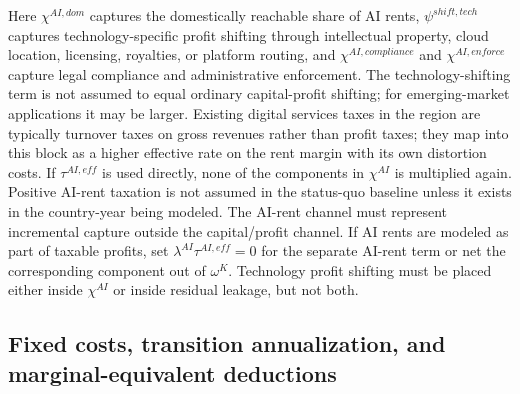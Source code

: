 \documentclass[11pt,a4paper]{article}
\begin{document}
Here $\chi^{AI,dom}$ captures the domestically reachable share of AI rents, $\psi^{shift,tech}$ captures technology-specific profit shifting through intellectual property, cloud location, licensing, royalties, or platform routing, and $\chi^{AI,compliance}$ and $\chi^{AI,enforce}$ capture legal compliance and administrative enforcement. The technology-shifting term is not assumed to equal ordinary capital-profit shifting; for emerging-market applications it may be larger. Existing digital services taxes in the region are typically turnover taxes on gross revenues rather than profit taxes; they map into this block as a higher effective rate on the rent margin with its own distortion costs. If $\tau^{AI,eff}$ is used directly, none of the components in $\chi^{AI}$ is multiplied again. Positive AI-rent taxation is not assumed in the status-quo baseline unless it exists in the country-year being modeled. The AI-rent channel must represent incremental capture outside the capital/profit channel. If AI rents are modeled as part of taxable profits, set $\lambda^{AI}\tau^{AI,eff}=0$ for the separate AI-rent term or net the corresponding component out of $\omega^K$. Technology profit shifting must be placed either inside $\chi^{AI}$ or inside residual leakage, but not both.

\subsection{Fixed costs, transition annualization, and marginal-equivalent deductions}
\end{document}
